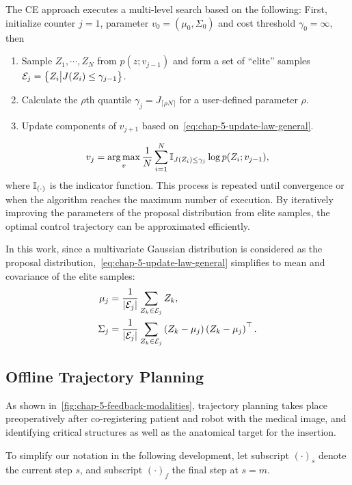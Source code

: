 The CE approach executes a multi-level search based on the following:
First, initialize counter $j=1$, parameter $v_0 = \left(\mu_0, \Sigma_0 \right)$ and cost threshold $\gamma_0 = \infty$, then
\begin{enumerate}
\item Sample $Z_1, \cdots, Z_N$ from $p(z; v_{j-1})$ and form a set of ``elite'' samples $\mathcal{E}_j = \left\{ Z_i \big\vert J(Z_i) \leq \gamma_{j-1}\right\}$.
\item Calculate the $\rho$th quantile $\gamma_j = J_{\lceil{\rho N}\rceil}$ for a user-defined parameter $\rho$.
\item Update components of $v_{j+1}$ based on~\cref{eq:chap-5-update-law-general}.
\end{enumerate}
\begin{equation}
  \label{eq:chap-5-update-law-general}
  v_j = \operatorname*{arg\,max}_v \frac{1}{N}\sum_{i = 1}^N\mathbb{I}_{J(Z_i) \leq \gamma_j}\log p(Z_i; v_{j-1}),
\end{equation}
where $\mathbb{I}_{(\cdot)}$ is the indicator function.
This process is repeated until convergence or when the algorithm reaches the maximum number of execution. By iteratively improving the parameters of the proposal distribution from elite samples, the optimal control trajectory can be approximated efficiently.

In this work, since a multivariate Gaussian distribution is considered as the proposal distribution,~\cref{eq:chap-5-update-law-general} simplifies to mean and covariance of the elite samples:
\begin{align}
  \mu_j &= \frac{1}{\vert\mathcal{E}_j\vert} \sum_{Z_k \in \mathcal{E}_j}Z_k, \label{eq:chap-5-update-law-1}\\
  \Sigma_j &= \frac{1}{\vert\mathcal{E}_j\vert}\sum_{Z_k \in \mathcal{E}_j}\left( Z_k - \mu_j \right)\left( Z_k - \mu_j\right)^{\top}. \label{eq:chap-5-update-law-2}
\end{align}

\subsection{Offline Trajectory Planning}
\label{sec:chap-5-trajectory-planning}

As shown in~\cref{fig:chap-5-feedback-modalities}, trajectory planning takes place preoperatively after co-registering patient and robot with the medical image, and identifying critical structures as well as the anatomical target for the insertion.

To simplify our notation in the following development, let subscript $(\cdot)_s$ denote the current step $s$, and subscript $(\cdot)_f$ the final step at $s=m$.

